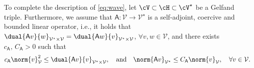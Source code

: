 To complete the description of \eqref{eq:wave}, let $\cV\subset\cH\subset\cV^\star$ be a Gelfand triple. Furthermore, we assume that $\mathsf{A}:\mathcal{V} \rightarrow \mathcal{V}^\star$ is a self-adjoint, coercive and bounded linear operator, i.e., it holds that 
$\dual{\mathsf{A}v}{w}_{\mathcal{V}^\star \times \mathcal{V}} = \dual{\mathsf{A}w}{v}_{\mathcal{V}^\star \times \mathcal{V}}$, $\forall v,w \in \mathcal{V}$, 
and there exists $ c_{\mathsf{A}}, \, C_{\mathsf{A}}>0$ such that
\begin{equation}\label{eq:A_continuous_coercive}
    c_{\mathsf{A}}
    \norm{v}^2_{\mathcal{V}}
    \leq \dual{\mathsf{A}v}{v}_{\mathcal{V}^\star \times \mathcal{V}},
    \quad
    \text{and}
    \quad
    \norm{\mathsf{A}v}_{\mathcal{V}^\star}
    \leq
    C_{\mathsf{A}}
    \norm{v}_{\mathcal{V}},
    \quad
    \forall 
    v \in \mathcal{V}.
\end{equation}




